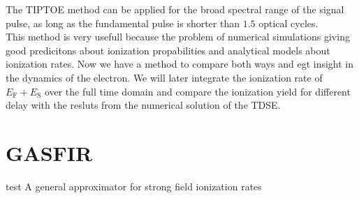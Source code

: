 The TIPTOE method can be applied for the broad spectral range of the signal pulse, as long as the fundamental pulse is shorter than $1.5$ optical cycles.\\
This method is very usefull because the problem of numerical simulations giving good predicitons about ionization propabilities and analytical models about ionization rates.
Now we have a method to compare both ways and egt insight in the dynamics of the electron. 
We will later integrate the ionization rate of $E_{\mathrm{F}}+E_{\mathrm{S}}$ over the full time domain and compare the ionization yield for different delay with the resluts from the numerical solution of the TDSE.







\section{GASFIR}
test
A general approximator for strong field ionization rates
